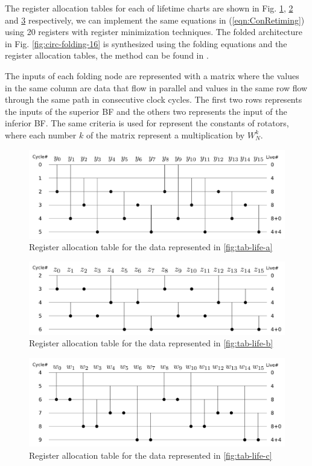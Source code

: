 \documentclass[journal,comsoc]{IEEEtran}
\begin{document}
The register allocation tables for each of lifetime charts are shown in Fig. \ref{fig:tab-aloc-a}, \ref{fig:tab-aloc-b} and \ref{fig:tab-aloc-c} respectively, we can implement the same equations in (\ref{eqn:ConRetiming}) using 20 registers with register minimization techniques. The folded architecture in Fig. \ref{fig:circ-folding-16} is synthesized using the folding equations and the register allocation tables, the method can be found in \cite{pipeline_parhi_book}. 

The inputs of each folding node are represented with a matrix where the values in the same column are data that flow in parallel and values in the same row
flow through the same path in consecutive clock cycles. The first two rows represents the inputs of the superior BF and the others two represents the input of the inferior BF. 
The same criteria is used for represent the constants of rotators, where each number $k$ of the matrix represent a multiplication by $W^k_N$.
\begin{figure}[!t]
\centering
 \includegraphics[width=0.95\linewidth]{Diagramas/life_chart_a.png}
\caption{Register allocation table for the data represented in \ref{fig:tab-life-a}}
\label{fig:tab-aloc-a}
\end{figure}
\begin{figure}[!t]
\centering
 \includegraphics[width=0.95\linewidth]{Diagramas/life_chart_b.png}
\caption{Register allocation table for the data represented in \ref{fig:tab-life-b}}
\label{fig:tab-aloc-b}
\end{figure}
\begin{figure}[!t]
\centering
 \includegraphics[width=0.95\linewidth]{Diagramas/life_chart_c.png}
\caption{Register allocation table for the data represented in \ref{fig:tab-life-c}}
\label{fig:tab-aloc-c}
\end{figure}
\end{document}
